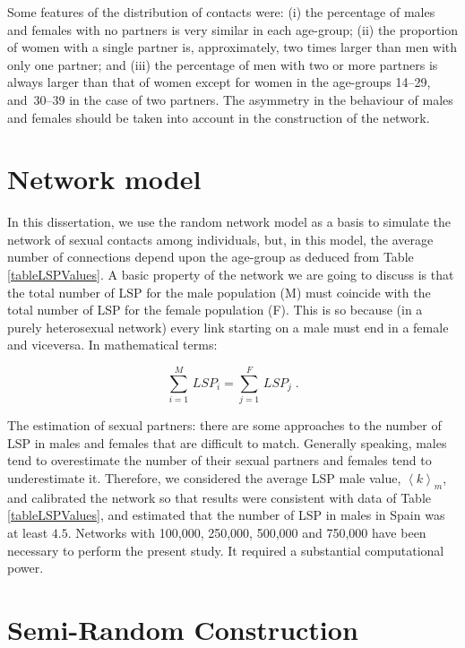 Some features of the distribution of contacts were: (i) the percentage of males and females with no partners is
very similar in each age-group; (ii) the proportion of women  with a single partner is, approximately, two times larger than men with only one partner; and (iii) the percentage of men with two or more partners is always larger than that of women except for women in the age-groups 14--29, and~30--39 in the case of two partners. The asymmetry in the behaviour of males and females should be taken into account in the construction of the network.

\section{Network model}

In this dissertation, we use the random network model as a basis to simulate the network of sexual contacts among individuals, but, in this model, the average number of connections depend upon the age-group as deduced from Table \ref{tableLSPValues}. A basic property of the network we are going to discuss is that the total number of LSP for the male population (M) must coincide with the total number of LSP for the female population (F). This is so because (in a purely heterosexual network) every link starting on a male must end in a female and viceversa. In mathematical terms:

\begin{equation}
\label{nodeseq}
\displaystyle\sum_{i=1}^M\, LSP_i=\displaystyle\sum_{j=1}^F\, LSP_j\; .
\end{equation}

The estimation of sexual partners: there are some approaches to the number of LSP in males and females \cite{chandra2013sexual,mosher2005sexual} that are difficult to match. Generally speaking, males tend to overestimate the number of their sexual partners and females tend to underestimate it. Therefore, we considered the average LSP male value, $\left\langle k \right\rangle_m$, and calibrated the network so that results were consistent with data of Table \ref{tableLSPValues}, and estimated that the number of LSP in males in Spain was at least $4.5$. Networks with 100,000, 250,000, 500,000 and 750,000 have been necessary to perform the present study. It required a substantial computational power.

\section{Semi-Random Construction}
\label{subsec22}

